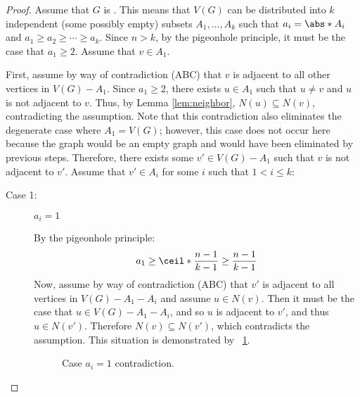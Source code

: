 \begin{proof}
  Assume that \(G\) is .  This means that \(V(G)\) can be distributed into \(k\) independent (some
  possibly empty) subsets \(A_1,\ldots,A_k\) such that \(a_i=\abs*{A_i}\) and \(a_1\ge a_2\ge\cdots\ge a_k\).
  Since \(n>k\), by the pigeonhole principle, it must be the case that \(a_1\ge2\).  Assume that \(v\in A_1\).

  First, assume by way of contradiction (ABC) that \(v\) is adjacent to all other vertices in \(V(G)-A_1\).  Since
  \(a_1\ge2\), there exists \(u\in A_1\) such that \(u\ne v\) and \(u\) is not adjacent to \(v\).  Thus, by Lemma
  \ref{lem:neighbor}, \(N(u)\subseteq N(v)\), contradicting the assumption.  Note that this contradiction also
  eliminates the degenerate case where \(A_1=V(G)\); however, this case does not occur here because the graph would
  be an empty graph and would have been eliminated by previous steps.  Therefore, there exists some \(v'\in
  V(G)-A_1\) such that \(v\) is not adjacent to \(v'\).  Assume that \(v'\in A_i\) for some \(i\) such that
  \(1<i\le k\):

  \begin{description}
  \item [Case 1:] \(a_i=1\)

    By the pigeonhole principle:
    \[a_1\ge\ceil*{\frac{n-1}{k-1}}\ge\frac{n-1}{k-1}\]
    Now, assume by way of contradiction (ABC) that \(v'\) is adjacent to all vertices in \(V(G)-A_1-A_i\) and
    assume \(u\in N(v)\).  Then it must be the case that \(u\in V(G)-A_1-A_i\), and so \(u\) is adjacent to \(v'\),
    and thus \(u\in N(v')\).  Therefore \(N(v)\subseteq N(v')\), which contradicts the assumption.  This situation
    is demonstrated by \figurename~\ref{fig:aione}.

    \begin{figure}[H]
      \centering
      \caption{Case \(a_i=1\) contradiction.}
      \label{fig:aione}
    \end{figure}


\end{description}
\end{proof}
